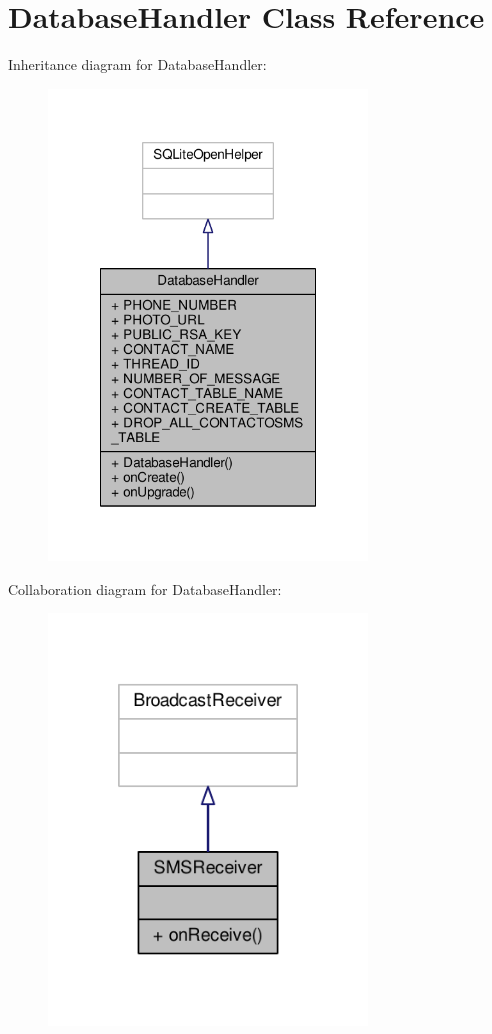 \hypertarget{a00010}{\section{Database\+Handler Class Reference}
\label{a00010}
}


Inheritance diagram for Database\+Handler\+:
\nopagebreak
\begin{figure}[H]
\begin{center}
\leavevmode
\includegraphics[width=240pt]{a00048}
\end{center}
\end{figure}


Collaboration diagram for Database\+Handler\+:
\nopagebreak
\begin{figure}[H]
\begin{center}
\leavevmode
\includegraphics[width=240pt]{a00049}
\end{center}
\end{figure}

